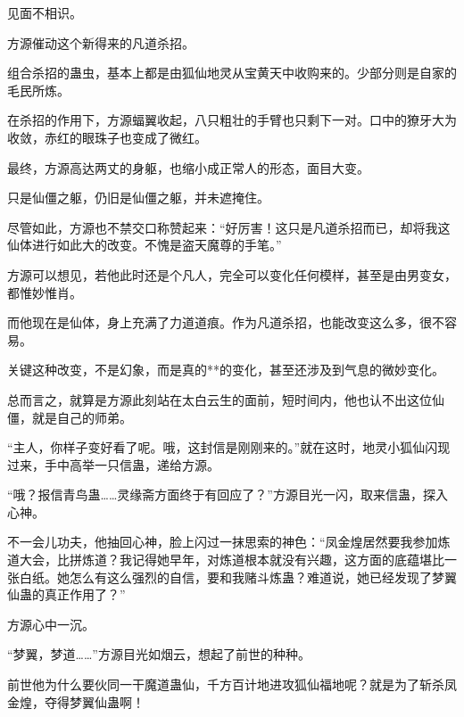 \begin{this_body}
见面不相识。

方源催动这个新得来的凡道杀招。

组合杀招的蛊虫，基本上都是由狐仙地灵从宝黄天中收购来的。少部分则是自家的毛民所炼。

在杀招的作用下，方源蝠翼收起，八只粗壮的手臂也只剩下一对。口中的獠牙大为收敛，赤红的眼珠子也变成了微红。

最终，方源高达两丈的身躯，也缩小成正常人的形态，面目大变。

只是仙僵之躯，仍旧是仙僵之躯，并未遮掩住。

尽管如此，方源也不禁交口称赞起来：“好厉害！这只是凡道杀招而已，却将我这仙体进行如此大的改变。不愧是盗天魔尊的手笔。”

方源可以想见，若他此时还是个凡人，完全可以变化任何模样，甚至是由男变女，都惟妙惟肖。

而他现在是仙体，身上充满了力道道痕。作为凡道杀招，也能改变这么多，很不容易。

关键这种改变，不是幻象，而是真的**的变化，甚至还涉及到气息的微妙变化。

总而言之，就算是方源此刻站在太白云生的面前，短时间内，他也认不出这位仙僵，就是自己的师弟。

“主人，你样子变好看了呢。哦，这封信是刚刚来的。”就在这时，地灵小狐仙闪现过来，手中高举一只信蛊，递给方源。

“哦？报信青鸟蛊……灵缘斋方面终于有回应了？”方源目光一闪，取来信蛊，探入心神。

不一会儿功夫，他抽回心神，脸上闪过一抹思索的神色：“凤金煌居然要我参加炼道大会，比拼炼道？我记得她早年，对炼道根本就没有兴趣，这方面的底蕴堪比一张白纸。她怎么有这么强烈的自信，要和我赌斗炼蛊？难道说，她已经发现了梦翼仙蛊的真正作用了？”

方源心中一沉。

“梦翼，梦道……”方源目光如烟云，想起了前世的种种。

前世他为什么要伙同一干魔道蛊仙，千方百计地进攻狐仙福地呢？就是为了斩杀凤金煌，夺得梦翼仙蛊啊！

\end{this_body}


